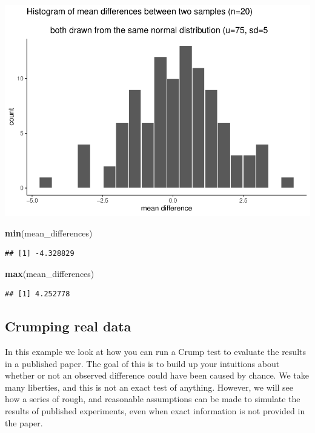 \documentclass[]{book}
\newenvironment{Shaded}{\begin{snugshade}}{\end{snugshade}}
\newcommand{\KeywordTok}[1]{\textcolor[rgb]{0.13,0.29,0.53}{\textbf{#1}}}
\newcommand{\NormalTok}[1]{#1}
\begin{document}
\includegraphics{Statistics_Lab_files/figure-latex/unnamed-chunk-147-1.pdf}

\begin{Shaded}
\begin{Highlighting}[]
\KeywordTok{min}\NormalTok{(mean_differences)}
\end{Highlighting}
\end{Shaded}

\begin{verbatim}
## [1] -4.328829
\end{verbatim}

\begin{Shaded}
\begin{Highlighting}[]
\KeywordTok{max}\NormalTok{(mean_differences)}
\end{Highlighting}
\end{Shaded}

\begin{verbatim}
## [1] 4.252778
\end{verbatim}

\subsection{Crumping real data}\label{crumping-real-data}

In this example we look at how you can run a Crump test to evaluate the
results in a published paper. The goal of this is to build up your
intuitions about whether or not an observed difference could have been
caused by chance. We take many liberties, and this is not an exact test
of anything. However, we will see how a series of rough, and reasonable
assumptions can be made to simulate the results of published
experiments, even when exact information is not provided in the paper.
\end{document}
